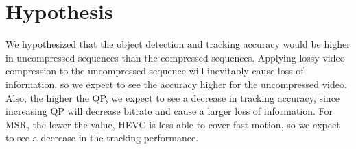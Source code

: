 \section{Hypothesis}
\label{sec:background/section_e}

We hypothesized that the object detection and tracking accuracy would be higher in uncompressed sequences than the compressed sequences. Applying lossy video compression to the uncompressed sequence will inevitably cause loss of information, so we expect to see the accuracy higher for the uncompressed video. Also, the higher the QP, we expect to see a decrease in tracking accuracy, since increasing QP will decrease bitrate and cause a larger loss of information. For MSR, the lower the value, HEVC is less able to cover fast motion, so we expect to see a decrease in the tracking performance.